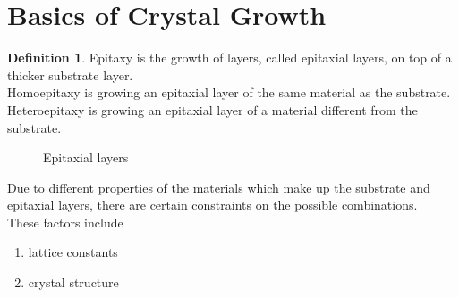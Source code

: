 \documentclass[titlepage, fleqn, a4paper, 12pt, twoside]{article}
\theoremstyle{definition}
\newtheorem{definition}{Definition}
\theoremstyle{theorem}
\begin{document}
\section{Basics of Crystal Growth}

\begin{definition}
	Epitaxy is the growth of layers, called epitaxial layers, on top of a thicker substrate layer.\\
	Homoepitaxy is growing an epitaxial layer of the same material as the substrate.
	Heteroepitaxy is growing an epitaxial layer of a material different from the substrate.
	\begin{figure}[H]
		\caption{Epitaxial layers}
	\end{figure}
\end{definition}

Due to different properties of the materials which make up the substrate and epitaxial layers, there are certain constraints on the possible combinations.\\
These factors include
\begin{enumerate}
	\item lattice constants
	\item crystal structure
\end{enumerate}
\end{document}
